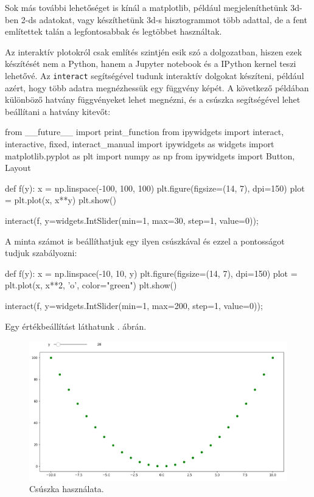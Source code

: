     Sok más további lehetőséget is kínál a matplotlib, például megjeleníthetünk
3d-ben 2-ds adatokat, vagy készíthetünk 3d-s hisztogrammot több adattal,
de a fent említettek talán a legfontosabbak és legtöbbet használtak.


Az interaktív plotokról csak említés szintjén esik szó a dolgozatban, hiszen ezek
készítését nem a Python, hanem a Jupyter notebook és a IPython kernel
teszi lehetővé. Az
\texttt{interact} segítségével tudunk interaktív dolgokat készíteni, például azért, hogy több adatra megnézhessük egy függvény képét. A következő
példában különböző hatvány függvényeket lehet megnézni, és a csúszka
segítségével lehet beállítani a hatvány kitevőt:
\begin{python}
from __future__ import print_function
from ipywidgets import interact, interactive, fixed, interact_manual
import ipywidgets as widgets
import matplotlib.pyplot as plt
import numpy as np
from ipywidgets import Button, Layout

def f(y):
    x = np.linspace(-100, 100, 100)
    plt.figure(figsize=(14, 7), dpi=150)
    plot = plt.plot(x, x**y)
    plt.show()

interact(f, y=widgets.IntSlider(min=1, max=30, step=1, value=0));
\end{python}
    
A minta számot is beállíthatjuk egy ilyen csúszkával és ezzel a pontosságot tudjuk szabályozni:
\begin{python}
def f(y):
    x = np.linspace(-10, 10, y)
    plt.figure(figsize=(14, 7), dpi=150)
    plot = plt.plot(x, x**2, 'o', color="green")
    plt.show()

interact(f, y=widgets.IntSlider(min=1, max=200, step=1, value=0));
\end{python}
Egy értékbeállítást láthatunk . ábrán.

\begin{figure}[h!]
\centering
\includegraphics[width=\textwidth]{img/interact-1.png}
\caption{Csúszka használata.}
\label{fig:interact-1}
\end{figure}

